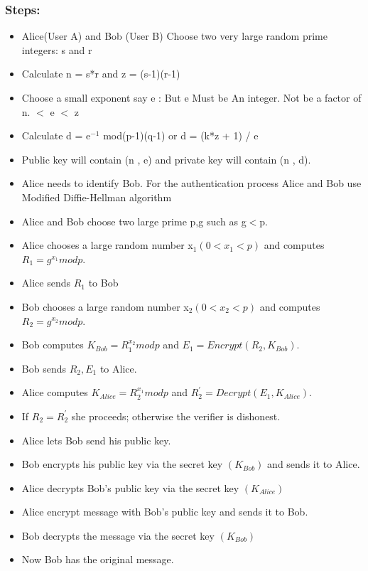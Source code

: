 \subsubsection{Steps:}
\vspace{-18pt}
\begin{itemize}
	\item Alice(User A) and Bob (User B) Choose two very large random prime integers: s and r
	\item Calculate n = s*r and z = (s-1)(r-1)
	\item Choose a small exponent say e :
	      \subitem But e Must be
	      \subitem An integer.
	      \subitem Not be a factor of n.
	       $<$ e $<$ z

	\item Calculate d = e$^{-1}$ mod(p-1)(q-1) or d = (k*z + 1) / e

	\item Public key will contain (n , e) and private key will contain
	      (n , d).
	\item Alice needs to identify Bob. For the authentication
	      process Alice and Bob use Modified Diffie-Hellman
	      algorithm
	\item Alice and Bob choose two large prime p,g such as g$<$p.
	\item Alice chooses a large random number x$_{1} (0<x_{1}<p)$ and computes $R_{1} = g^{x_{1}} mod p.$
	\item Alice sends $R_{1}$ to Bob
	\item Bob chooses a large random number x$_{2} (0<x_{2}<p)$ and computes $R_{2} = g^{x_{2}} mod p.$
	\item  Bob computes $K_{Bob} = R_{1}^{x_{2}} mod p$
	      and $E_{1}=Encrypt(R_{2},K_{Bob}).$
	\item Bob sends $R_{2},E_{1}$ to Alice.
	\item Alice computes $K_{Alice} = R_{2}^{x_{1}} mod p$
	      and $R^{'}_{2}=Decrypt(E_{1},K_{Alice}).$
	\item If $R_{2}=R^{'}_{2}$ she proceeds; otherwise the verifier is
	      dishonest.
	\item Alice lets Bob send his public key.
	\item Bob encrypts his public key via the secret key $(K_{Bob})$ and
	      sends it to Alice.
	\item Alice decrypts Bob's public key via the secret key $(K_{Alice})$
	\item Alice encrypt message with Bob’s public key and sends
	      it to Bob.
	\item Bob decrypts the message via the secret key $(K_{Bob})$
	\item Now Bob has the original message.


\end{itemize}
